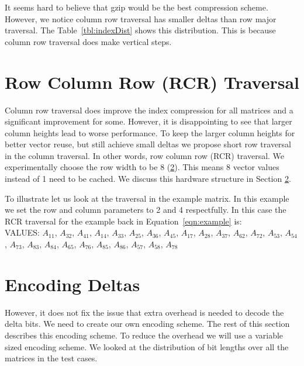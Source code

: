 It seems hard to believe that gzip would be the best compression scheme. However, we notice column row traversal has smaller deltas than row major traversal. The Table~\ref{tbl:indexDist} shows this distribution. This is because column row traversal does make vertical steps.
\section{Row Column Row (RCR) Traversal}
\par Column row traversal does improve the index compression for all matrices and a significant improvement for some. However, it is disappointing to see that larger column heights lead to worse performance. To keep the larger column heights for better vector reuse, but still achieve small deltas we propose short row traversal in the column traversal. In other words, row column row (RCR) traversal. We experimentally choose the row width to be 8 (\figurename \ref{}). This means 8 vector values instead of 1 need to be cached. We discuss this hardware structure in Section \ref{}.
\par To illustrate let us look at the traversal in the example matrix. In this example we set the row and column parameters to 2 and 4 respectfully. In this case the RCR traversal for the example back in Equation~\ref{eqn:example} is:\\
VALUES: $A_{11}$, $A_{32}$, $A_{41}$, $A_{14}$, $A_{33}$, $A_{25}$, $A_{36}$, $A_{45}$, $A_{17}$, $A_{28}$, $A_{37}$, $A_{62}$, $A_{72}$, $A_{53}$, $A_{54}$, $A_{73}$, $A_{83}$, $A_{84}$, $A_{65}$, $A_{76}$, $A_{85}$, $A_{86}$, $A_{57}$, $A_{58}$, $A_{78}$

\section{Encoding Deltas}
However, it does not fix the issue that extra overhead is needed to decode the delta bits. We need to create our own encoding scheme. The rest of this section describes this encoding scheme. To reduce the overhead we will use a variable sized encoding scheme. We looked at the distribution of bit lengths over all the matrices in the test cases. \par



